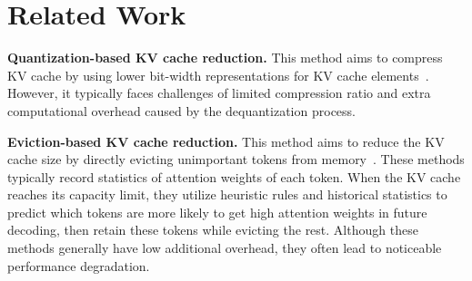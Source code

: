 \section{Related Work}



\noindent\textbf{Quantization-based KV cache reduction.}
This method aims to compress KV cache by using lower bit-width representations for KV cache elements~\citep{kivi, kvquant}.
However, it typically faces challenges of limited compression ratio and extra computational overhead caused by the dequantization process.

\noindent\textbf{Eviction-based KV cache reduction.}
This method aims to reduce the KV cache size by directly evicting unimportant tokens from memory~\citep{streaming-llm, h2o, snapkv, pyramidinfer}. 
These methods typically record statistics of attention weights of each token. 
When the KV cache reaches its capacity limit, they utilize heuristic rules and historical statistics to predict which tokens are more likely to get high attention weights in future decoding, then retain these tokens while evicting the rest. 
Although these methods generally have low additional overhead, they often lead to noticeable performance degradation.

